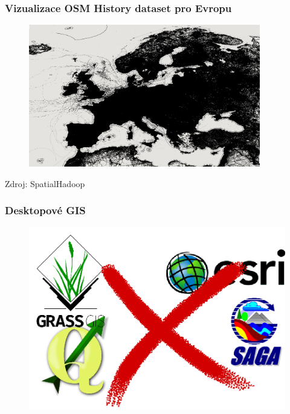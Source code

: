 \documentclass[unicode,bookmarksnumbered]{beamer}
\begin{document}
	\begin{frame}
		\frametitle{Vizualizace OSM History dataset pro Evropu}
		\begin{figure}
			\centering
			\includegraphics[width=0.9\textwidth]{./img/motivace/eu_all.png}
			\label{fig:eu_all}
		\end{figure}
		Zdroj: SpatialHadoop
	\end{frame}

	\begin{frame}
		\frametitle{Desktopové GIS}
		\begin{figure}
			\centering
			\includegraphics[width=1\textwidth]{./img/motivace/no.png}
			\label{fig:eu_all}
		\end{figure}
	\end{frame}
\end{document}
